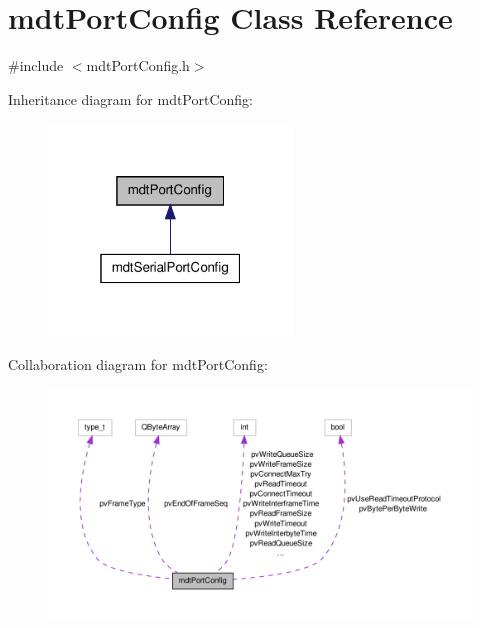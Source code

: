 \hypertarget{classmdt_port_config}{\section{mdt\-Port\-Config Class Reference}
\label{classmdt_port_config}
}


{\ttfamily \#include $<$mdt\-Port\-Config.\-h$>$}



Inheritance diagram for mdt\-Port\-Config\-:\nopagebreak
\begin{figure}[H]
\begin{center}
\leavevmode
\includegraphics[width=184pt]{classmdt_port_config__inherit__graph}
\end{center}
\end{figure}


Collaboration diagram for mdt\-Port\-Config\-:\nopagebreak
\begin{figure}[H]
\begin{center}
\leavevmode
\includegraphics[width=350pt]{classmdt_port_config__coll__graph}
\end{center}
\end{figure}
